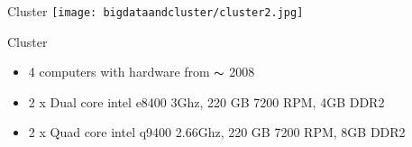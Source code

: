 \begin{frame}{Cluster}
  \centering \texttt{[image: bigdataandcluster/cluster2.jpg]}
\end{frame}
\begin{frame}{Cluster}
    \begin{itemize}
        \item 4 computers with hardware from $\thicksim$ 2008
        \item 2 x Dual core intel e8400 3Ghz, 220 GB 7200 RPM, 4GB DDR2
        \item 2 x Quad core intel q9400 2.66Ghz, 220 GB 7200 RPM, 8GB DDR2
    \end{itemize}
    
\end{frame}






